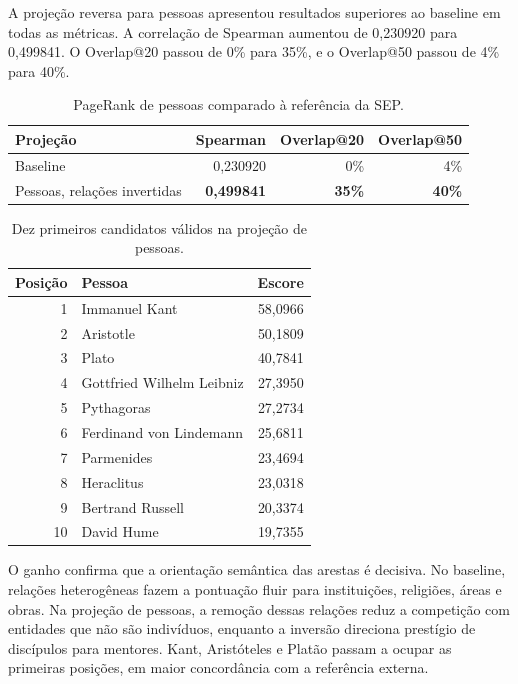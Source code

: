 \documentclass[10pt,a4paper]{article}
\begin{document}
A projeção reversa para pessoas apresentou resultados superiores ao baseline em todas as métricas. A correlação de Spearman aumentou de 0,230920 para 0,499841. O Overlap@20 passou de 0\% para 35\%, e o Overlap@50 passou de 4\% para 40\%.

\begin{table}[htbp]
  \centering
  \caption{PageRank de pessoas comparado à referência da SEP.}
  \label{tab:resultado-pessoas}
  \begin{tabular}{lrrr}
    \toprule
    Projeção & Spearman & Overlap@20 & Overlap@50 \\
    \midrule
    Baseline & 0,230920 & 0\% & 4\% \\
    Pessoas, relações invertidas & \textbf{0,499841} & \textbf{35\%} & \textbf{40\%} \\
    \bottomrule
  \end{tabular}
\end{table}

\begin{table}[htbp]
  \centering
  \caption{Dez primeiros candidatos válidos na projeção de pessoas.}
  \label{tab:top-pessoas}
  \begin{tabular}{r l r}
    \toprule
    Posição & Pessoa & Escore \\
    \midrule
    1 & Immanuel Kant & 58,0966 \\
    2 & Aristotle & 50,1809 \\
    3 & Plato & 40,7841 \\
    4 & Gottfried Wilhelm Leibniz & 27,3950 \\
    5 & Pythagoras & 27,2734 \\
    6 & Ferdinand von Lindemann & 25,6811 \\
    7 & Parmenides & 23,4694 \\
    8 & Heraclitus & 23,0318 \\
    9 & Bertrand Russell & 20,3374 \\
    10 & David Hume & 19,7355 \\
    \bottomrule
  \end{tabular}
\end{table}

O ganho confirma que a orientação semântica das arestas é decisiva. No baseline, relações heterogêneas fazem a pontuação fluir para instituições, religiões, áreas e obras. Na projeção de pessoas, a remoção dessas relações reduz a competição com entidades que não são indivíduos, enquanto a inversão direciona prestígio de discípulos para mentores. Kant, Aristóteles e Platão passam a ocupar as primeiras posições, em maior concordância com a referência externa.
\end{document}
